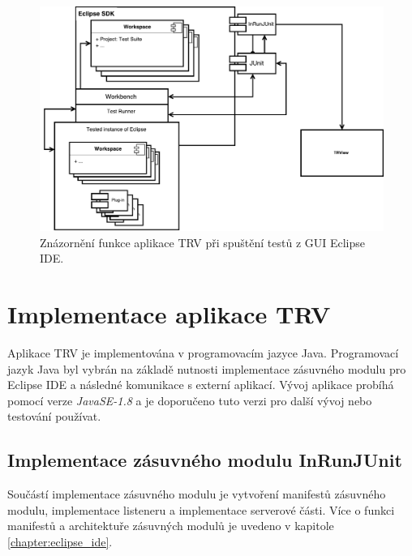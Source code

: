     \begin{figure}
      \includegraphics[width=\textwidth, center]{obrazky-figures/TRV_run_from_gui.pdf}
      \caption{Znázornění funkce aplikace TRV při spuštění testů z GUI Eclipse IDE.}
      \label{fig:TRV_run_from_gui}
    \end{figure}


  \section{Implementace aplikace TRV}
  Aplikace TRV je implementována v programovacím jazyce Java. Programovací jazyk Java byl vybrán na základě nutnosti implementace zásuvného modulu pro Eclipse IDE a následné komunikace s externí aplikací. Vývoj aplikace probíhá pomocí verze \emph{JavaSE-1.8} a je doporučeno tuto verzi pro další vývoj nebo testování používat.

    \subsection{Implementace zásuvného modulu InRunJUnit}
    Součástí implementace zásuvného modulu je vytvoření manifestů zásuvného modulu, implementace listeneru a implementace serverové části. Více o funkci manifestů a architektuře zásuvných modulů je uvedeno v kapitole \ref{chapter:eclipse_ide}.
      
